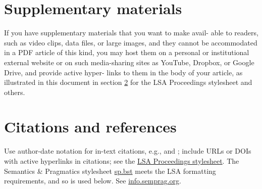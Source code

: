 \documentclass[12pt,letterpaper]{article}
\begin{document}
 
 \section{Supplementary materials} If you have supplementary materials that you want to make avail- able to readers, such as video clips, data files, or large images, and they cannot be accommodated in a PDF article of this kind, you may host them on a personal or institutional external website or on such media-sharing sites as YouTube, Dropbox, or Google Drive, and provide active hyper- links to them in the body of your article, as illustrated in this document in section \ref{s:cite} for the LSA Proceedings stylesheet and others.
 
 
 
\section{Citations and references} \label{s:cite} Use author-date notation for in-text citations, e.g., \citep{partee:1984b} and \citet{partee:1984b}; include URLs or DOIs with active hyperlinks in citations; see the \href{http://journals.linguisticsociety.org/proceedings/index.php/PLSA/pages/view/instructions}{LSA Proceedings stylesheet}. The Semantics \& Pragmatics stylesheet \href{https://raw.githubusercontent.com/semprag/tex/master/sp.bst}{sp.bst} meets the LSA formatting requirements, and so is used below. See \href{http://info.semprag.org}{info.semprag.org}. 
 
\setlength{\bibhang}{0.4in}			%
\titleformat{\section}{\normalfont\bfseries}{\thesection}{.5em}{}		%


\newcommand{\doi}[1]{\url{http://dx.doi.org/#1}}	%
\end{document}
